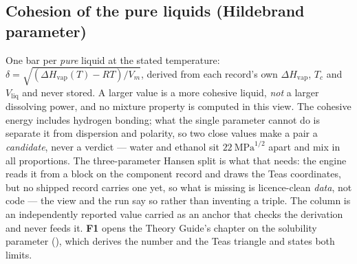 \documentclass[11pt,a4paper]{article}
\begin{document}
\subsection{Cohesion of the pure liquids (Hildebrand parameter)}\label{sec:explorer-hildebrand}
One bar per \emph{pure} liquid at the stated temperature:
$\delta = \sqrt{(\Delta H_{\mathrm{vap}}(T) - RT)/V_m}$, derived from each
record's own $\Delta H_{\mathrm{vap}}$, $T_c$ and $V_{\mathrm{liq}}$ and never
stored.  A larger value is a more cohesive liquid, \emph{not} a larger
dissolving power, and no mixture property is computed in this view.  The
cohesive energy includes hydrogen bonding; what the single parameter cannot
do is separate it from dispersion and polarity, so two close values make a
pair a \emph{candidate}, never a verdict --- water and ethanol sit
$22~\mathrm{MPa}^{1/2}$ apart and mix in all proportions.  The
three-parameter Hansen split is what that needs: the engine reads it from a
 block on the component record and draws the
Teas coordinates, but no shipped record carries one yet, so what is missing
is licence-clean \emph{data}, not code --- the view and the run say so
rather than inventing a triple.  The  column is an
independently reported value carried as an anchor that checks the derivation
and never feeds it.  \textbf{F1} opens the Theory Guide's chapter on the
solubility parameter (), which derives the
number and the Teas triangle and states both limits.
\end{document}
